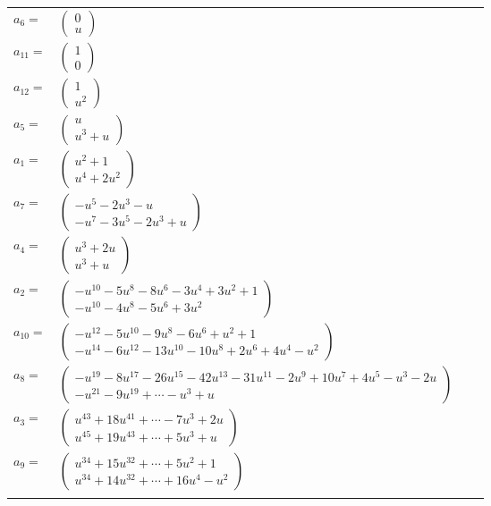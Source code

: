 \documentclass[1p]{elsarticle_modified}
\theoremstyle{definition}
\begin{document}
\begin{tabular}{m{7pt} m{180pt} m{7pt} m{180pt} }
\flushright $a_{6}=$&$\begin{pmatrix}0\\u\end{pmatrix}$ \\
\flushright $a_{11}=$&$\begin{pmatrix}1\\0\end{pmatrix}$ \\
\flushright $a_{12}=$&$\begin{pmatrix}1\\u^2\end{pmatrix}$ \\
\flushright $a_{5}=$&$\begin{pmatrix}u\\u^3+u\end{pmatrix}$ \\
\flushright $a_{1}=$&$\begin{pmatrix}u^2+1\\u^4+2 u^2\end{pmatrix}$ \\
\flushright $a_{7}=$&$\begin{pmatrix}- u^5-2 u^3- u\\- u^7-3 u^5-2 u^3+u\end{pmatrix}$ \\
\flushright $a_{4}=$&$\begin{pmatrix}u^3+2 u\\u^3+u\end{pmatrix}$ \\
\flushright $a_{2}=$&$\begin{pmatrix}- u^{10}-5 u^8-8 u^6-3 u^4+3 u^2+1\\- u^{10}-4 u^8-5 u^6+3 u^2\end{pmatrix}$ \\
\flushright $a_{10}=$&$\begin{pmatrix}- u^{12}-5 u^{10}-9 u^8-6 u^6+u^2+1\\- u^{14}-6 u^{12}-13 u^{10}-10 u^8+2 u^6+4 u^4- u^2\end{pmatrix}$ \\
\flushright $a_{8}=$&$\begin{pmatrix}- u^{19}-8 u^{17}-26 u^{15}-42 u^{13}-31 u^{11}-2 u^9+10 u^7+4 u^5- u^3-2 u\\- u^{21}-9 u^{19}+\cdots- u^3+u\end{pmatrix}$ \\
\flushright $a_{3}=$&$\begin{pmatrix}u^{43}+18 u^{41}+\cdots-7 u^3+2 u\\u^{45}+19 u^{43}+\cdots+5 u^3+u\end{pmatrix}$ \\
\flushright $a_{9}=$&$\begin{pmatrix}u^{34}+15 u^{32}+\cdots+5 u^2+1\\u^{34}+14 u^{32}+\cdots+16 u^4- u^2\end{pmatrix}$\\&\end{tabular}
\end{document}
